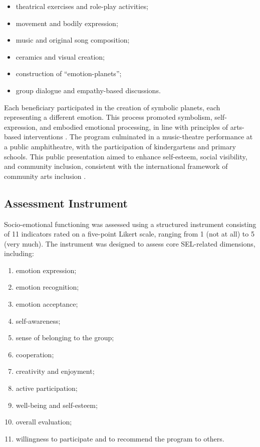 \documentclass[12pt,a4paper]{article}
\begin{document}
\begin{itemize}
    \item theatrical exercises and role-play activities;
    \item movement and bodily expression;
    \item music and original song composition;
    \item ceramics and visual creation;
    \item construction of ``emotion-planets'';
    \item group dialogue and empathy-based discussions.
\end{itemize}

Each beneficiary participated in the creation of symbolic planets, each representing a different emotion. This process promoted symbolism, self-expression, and embodied emotional processing, in line with principles of arts-based interventions \parencite{malchiodi2020,goldstein2017,hinz2009}. The program culminated in a music-theatre performance at a public amphitheatre, with the participation of kindergartens and primary schools. This public presentation aimed to enhance self-esteem, social visibility, and community inclusion, consistent with the international framework of community arts inclusion \parencite{nicholson2005,white2013}.

\subsection{Assessment Instrument}

Socio-emotional functioning was assessed using a structured instrument consisting of 11 indicators rated on a five-point Likert scale, ranging from 1 (not at all) to 5 (very much). The instrument was designed to assess core SEL-related dimensions, including:

\begin{enumerate}
    \item emotion expression;
    \item emotion recognition;
    \item emotion acceptance;
    \item self-awareness;
    \item sense of belonging to the group;
    \item cooperation;
    \item creativity and enjoyment;
    \item active participation;
    \item well-being and self-esteem;
    \item overall evaluation;
    \item willingness to participate and to recommend the program to others.
\end{enumerate}
\end{document}
